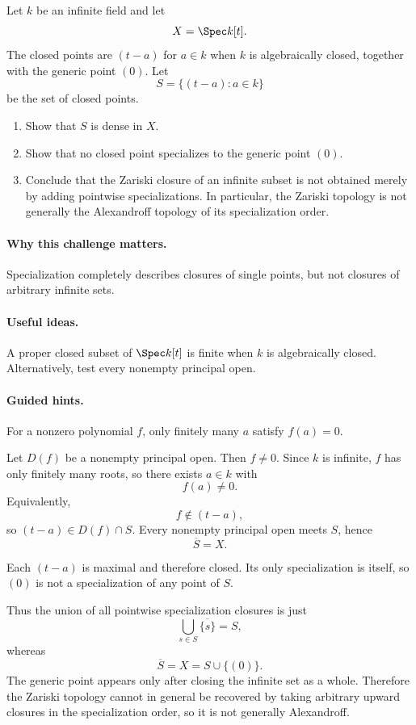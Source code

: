 \begin{problem}
Let $k$ be an infinite field and let
\[
X=\Spec k[t].
\]
The closed points are $(t-a)$ for $a\in k$ when $k$ is algebraically closed, together with
the generic point $(0)$.  Let
\[
S=\{(t-a):a\in k\}
\]
be the set of closed points.
\begin{enumerate}
\item Show that $S$ is dense in $X$.
\item Show that no closed point specializes to the generic point $(0)$.
\item Conclude that the Zariski closure of an infinite subset is not obtained merely by
adding pointwise specializations.  In particular, the Zariski topology is not generally
the Alexandroff topology of its specialization order.
\end{enumerate}
\end{problem}

\paragraph{Why this challenge matters.}
Specialization completely describes closures of single points, but not closures of arbitrary
infinite sets.

\paragraph{Useful ideas.}
A proper closed subset of $\Spec k[t]$ is finite when $k$ is algebraically closed.
Alternatively, test every nonempty principal open.

\paragraph{Guided hints.}
For a nonzero polynomial $f$, only finitely many $a$ satisfy $f(a)=0$.

\begin{solution}
Let $D(f)$ be a nonempty principal open.  Then $f\neq0$.  Since $k$ is infinite, $f$ has
only finitely many roots, so there exists $a\in k$ with
\[
f(a)\neq0.
\]
Equivalently,
\[
f\notin(t-a),
\]
so $(t-a)\in D(f)\cap S$.  Every nonempty principal open meets $S$, hence
\[
\overline S=X.
\]

Each $(t-a)$ is maximal and therefore closed.  Its only specialization is itself, so
$(0)$ is not a specialization of any point of $S$.

Thus the union of all pointwise specialization closures is just
\[
\bigcup_{s\in S}\overline{\{s\}}=S,
\]
whereas
\[
\overline S=X=S\cup\{(0)\}.
\]
The generic point appears only after closing the infinite set as a whole.  Therefore the
Zariski topology cannot in general be recovered by taking arbitrary upward closures in the
specialization order, so it is not generally Alexandroff.
\end{solution}

